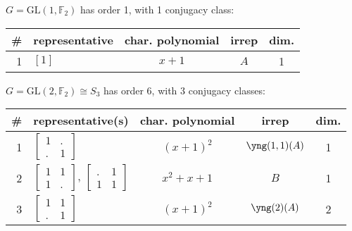 \documentclass[11pt,oneside]{article}
\newcommand{\GL}{\mathrm{GL}}
\newcommand{\Field}{\mathbb{F}}
\begin{document}
$G=\GL(1,\Field_2)$ has order 1, with 1 conjugacy class:
\begin{center}
\begin{tabular}{r|l|c|c|c}
\# & representative & char. polynomial & irrep & dim. \\
\hline
1 & $[1]$           & $x+1$            & $A$   & 1    \\
\end{tabular}
\end{center}

$G=\GL(2,\Field_2) \cong S_3$ has order 6, with 3 conjugacy classes:
\begin{center}
\begin{tabular}{r|l|c|c|c}
\# & representative(s) & char. polynomial & irrep & dim. \\
\hline
1  & $\begin{bmatrix}1&.\\.&1\end{bmatrix}$    & $(x+1)^2$  & $\yng(1,1)(A)$  & 1 \\
2  & $\begin{bmatrix}1&1\\1&.\end{bmatrix}$, $\begin{bmatrix}.&1\\1&1\end{bmatrix}$     & $x^2+x+1$  &  $B$  & 1 \\
3  & $\begin{bmatrix}1&1\\.&1\end{bmatrix}$    & $(x+1)^2$  & $\yng(2)(A)$ & 2  \\
\end{tabular}
\end{center}
\end{document}
